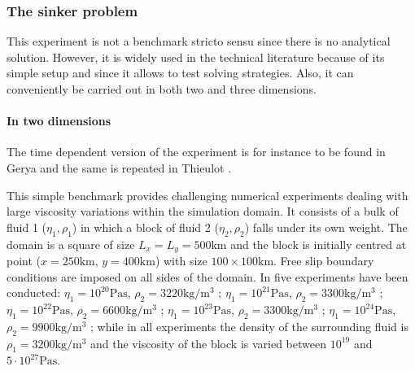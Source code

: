 \subsubsection{The sinker problem}\label{sec:sinker}

This experiment is not a benchmark stricto sensu since there is no analytical solution. However, it is widely used in the technical literature because of its simple setup and since it allows to test solving strategies.
Also, it can conveniently be carried out in both two and three dimensions.

\paragraph{In two dimensions} The time dependent version of the experiment is for instance to be found 
in Gerya \cite{gery10} and the same is repeated in Thieulot \cite{thie11}.

This simple benchmark provides challenging numerical experiments 
dealing with large viscosity variations within the simulation
domain. It consists of a bulk of fluid 1 ($\eta_1,\rho_1$) 
in which a block of fluid 2 ($\eta_2,\rho_2$) falls under its own
weight. The domain is a square of size $L_x = L_y = 500\si{\kilo\metre}$ and the
block is initially centred at point ($x=250\si{\km}$, $y=400\si{\km}$) with size
$100 \times 100\si{\km}$.
Free slip boundary conditions are imposed on all sides of the domain. 
In \cite{thie11} five experiments have been conducted:
$\eta_1 = 10^{20}\si{\pascal\second}$, $\rho_2=3220\si{\kg\per\cubic\metre}$ ;
$\eta_1 = 10^{21}\si{\pascal\second}$, $\rho_2=3300\si{\kg\per\cubic\metre}$ ;
$\eta_1 = 10^{22}\si{\pascal\second}$, $\rho_2=6600\si{\kg\per\cubic\metre}$ ;
$\eta_1 = 10^{23}\si{\pascal\second}$, $\rho_2=3300\si{\kg\per\cubic\metre}$ ;
$\eta_1 = 10^{24}\si{\pascal\second}$, $\rho_2=9900\si{\kg\per\cubic\metre}$ ;
while in all experiments the density of the surrounding fluid is
$\rho_1=3200\si{\kg\per\cubic\metre}$ and the viscosity of the block is varied between
$10^{19}$ and $5\cdot10^{27}\si{\pascal\second}$.

